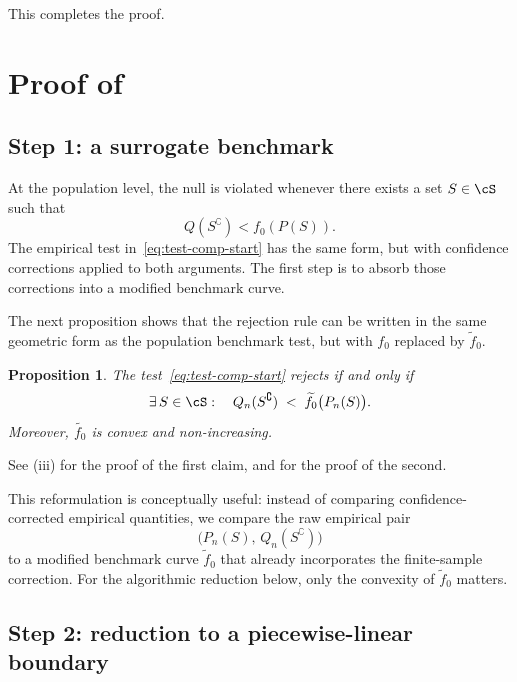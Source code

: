 \documentclass[english]{article}
\theoremstyle{plain}
\newtheorem{proposition}{Proposition}[section]
\theoremstyle{definition}
\newcommand{\fnull}{f_0}
\begin{document}
\noindent This completes the proof.

\section{Proof of~}\label{sec:proof-computation}


\subsection{Step 1: a surrogate benchmark}\label{sec:surrogate}

At the population level, the null is violated whenever there exists a set
\(S\in\cS\) such that
\[
Q(S^\complement)<\fnull(P(S)).
\]
The empirical test in~\eqref{eq:test-comp-start} has the same form, but with
confidence corrections applied to both arguments. The first step is to absorb
those corrections into a modified benchmark curve.



The next proposition shows that the rejection rule can be written in the same
geometric form as the population benchmark test, but with \(\fnull\) replaced
by \(\widetilde \fnull\).

\begin{proposition}\label{prop:equiv-surrogate-convex}
The test~\eqref{eq:test-comp-start} rejects if and only if
\begin{equation}\label{eq:test-surrogate}
\exists\, S \in \cS:\quad
Q_n(S^\complement) \;<\; \widetilde{f}_0\bigl(P_n(S)\bigr).
\end{equation}
Moreover, \(\widetilde{\fnull}\) is convex and non-increasing.
\end{proposition}


\noindent See (iii) for the proof of the first
claim, and  for the proof of the second.
\medskip

This reformulation is conceptually useful: instead of comparing
confidence-corrected empirical quantities, we compare the raw empirical pair
\[
\bigl(P_n(S),\,Q_n(S^\complement)\bigr)
\]
to a modified benchmark curve \(\widetilde \fnull\) that already incorporates
the finite-sample correction. For the algorithmic reduction below, only the
convexity of \(\widetilde \fnull\) matters.

\subsection{Step 2: reduction to a piecewise-linear boundary}\label{sec:discretization}
\end{document}
